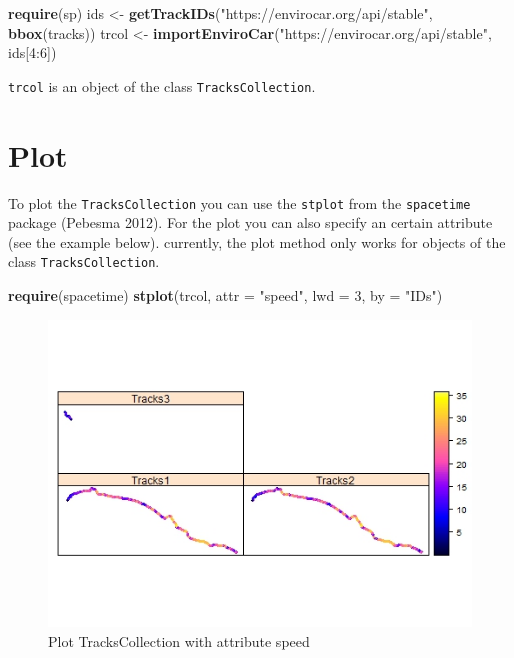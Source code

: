 \documentclass[]{article}
\newenvironment{Shaded}{\begin{snugshade}}{\end{snugshade}}
\newcommand{\KeywordTok}[1]{\textcolor[rgb]{0.13,0.29,0.53}{\textbf{{#1}}}}
\newcommand{\DataTypeTok}[1]{\textcolor[rgb]{0.13,0.29,0.53}{{#1}}}
\newcommand{\DecValTok}[1]{\textcolor[rgb]{0.00,0.00,0.81}{{#1}}}
\newcommand{\StringTok}[1]{\textcolor[rgb]{0.31,0.60,0.02}{{#1}}}
\newcommand{\NormalTok}[1]{{#1}}
\begin{document}
\begin{Shaded}
\begin{Highlighting}[]
\KeywordTok{require}\NormalTok{(sp)}
\NormalTok{ids <-}\StringTok{ }\KeywordTok{getTrackIDs}\NormalTok{(}\StringTok{"https://envirocar.org/api/stable"}\NormalTok{, }\KeywordTok{bbox}\NormalTok{(tracks))}
\NormalTok{trcol <-}\StringTok{ }\KeywordTok{importEnviroCar}\NormalTok{(}\StringTok{"https://envirocar.org/api/stable"}\NormalTok{, ids[}\DecValTok{4}\NormalTok{:}\DecValTok{6}\NormalTok{])}
\end{Highlighting}
\end{Shaded}

\texttt{trcol} is an object of the class \texttt{TracksCollection}.

\section{Plot}\label{plot}

To plot the \texttt{TracksCollection} you can use the \texttt{stplot}
from the \texttt{spacetime} package (Pebesma 2012). For the plot you can
also specify an certain attribute (see the example below). currently,
the plot method only works for objects of the class
\texttt{TracksCollection}.

\begin{Shaded}
\begin{Highlighting}[]
\KeywordTok{require}\NormalTok{(spacetime)}
\KeywordTok{stplot}\NormalTok{(trcol, }\DataTypeTok{attr =} \StringTok{"speed"}\NormalTok{, }\DataTypeTok{lwd =} \DecValTok{3}\NormalTok{, }\DataTypeTok{by =} \StringTok{"IDs"}\NormalTok{)}
\end{Highlighting}
\end{Shaded}

\begin{figure}[h!]
  \centering
    \includegraphics[width=1\textwidth]{figures/stplot.png}
    \caption{Plot TracksCollection with attribute speed}
    \label{fig:st}
\end{figure}
\end{document}
